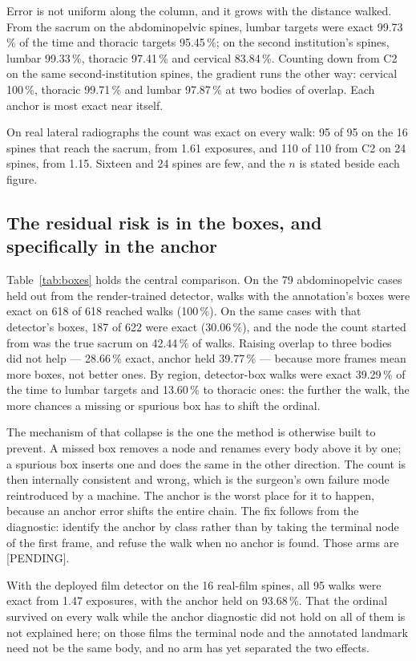 \documentclass[11pt,letterpaper]{article}
\newcommand{\pc}[1]{#1\,\%}
\begin{document}
Error is not uniform along the column, and it grows with the distance walked. From the sacrum on the
abdominopelvic spines, lumbar targets were exact \pc{99.73} of the time and thoracic targets \pc{95.45}; on
the second institution's spines, lumbar \pc{99.33}, thoracic \pc{97.41} and cervical \pc{83.84}. Counting down from C2 on the same
second-institution spines, the gradient runs the other way: cervical \pc{100}, thoracic \pc{99.71} and lumbar \pc{97.87} at two bodies
of overlap. Each anchor is most exact near itself.

On real lateral radiographs the count was exact on every walk: 95 of 95 on the 16 spines that reach the
sacrum, from 1.61 exposures, and 110 of 110 from C2 on 24 spines, from 1.15. Sixteen and 24 spines are few,
and the $n$ is stated beside each figure.

\subsection*{The residual risk is in the boxes, and specifically in the anchor}

Table~\ref{tab:boxes} holds the central comparison. On the 79 abdominopelvic cases held out from
the render-trained detector, walks with the annotation's boxes were exact on 618 of 618 reached walks
(\pc{100}). On the same cases with that detector's boxes, 187 of 622 were exact (\pc{30.06}), and the node
the count started from was the true sacrum on \pc{42.44} of walks. Raising overlap to three bodies did not
help --- \pc{28.66} exact, anchor held \pc{39.77} --- because more frames mean more boxes, not better ones.
By region, detector-box walks were exact \pc{39.29} of the time to lumbar targets and \pc{13.60} to
thoracic ones: the further the walk, the more chances a missing or spurious box has to shift the ordinal.

The mechanism of that collapse is the one the method is otherwise built to prevent. A missed box removes a
node and renames every body above it by one; a spurious box inserts one and does the same in the other
direction. The count is then internally consistent and wrong, which is the surgeon's own failure mode
reintroduced by a machine. The anchor is the worst place for it to happen, because an anchor error shifts
the entire chain. The fix follows from the diagnostic: identify the anchor by class rather than by taking
the terminal node of the first frame, and refuse the walk when no anchor is found. Those arms are
[PENDING].

With the deployed film detector on the 16 real-film spines, all 95 walks were exact from 1.47 exposures,
with the anchor held on \pc{93.68}. That the ordinal survived on every walk while the anchor diagnostic did
not hold on all of them is not explained here; on those films the terminal node and the annotated landmark
need not be the same body, and no arm has yet separated the two effects.
\end{document}
